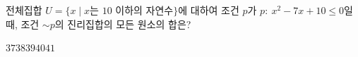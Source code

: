 전체집합 $U=\{x \mid x$는 $10$ 이하의 자연수$\}$에 대하여 조건 $p$가 $p:\ x^2-7x+10\le 0$일 때, 조건 $\sim p$의 진리집합의 모든 원소의 합은?
\begin{choices32}{$37$}{$38$}{$39$}{$40$}{$41$}\end{choices32}
